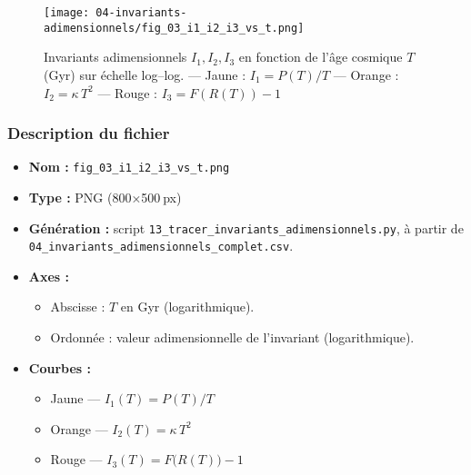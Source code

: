 \begin{figure}[htbp]
  \centering
  \texttt{[image: 04-invariants-adimensionnels/fig\_03\_i1\_i2\_i3\_vs\_t.png]}
  \caption{Invariants adimensionnels \(I_{1},I_{2},I_{3}\) en fonction de l’âge cosmique \(T\) (Gyr) sur échelle log–log.  
    — Jaune : \(I_{1}=P(T)/T\)  
    — Orange : \(I_{2}=\kappa\,T^{2}\)  
    — Rouge : \(I_{3}=F(R(T))-1\)}
  \label{fig:invariants_vs_t}
\end{figure}

\subsubsection*{Description du fichier}
\begin{itemize}
  \item \textbf{Nom :} \texttt{fig\_03\_i1\_i2\_i3\_vs\_t.png}  
  \item \textbf{Type :} PNG (800×500 px)  
  \item \textbf{Génération :} script \texttt{13\_tracer\_invariants\_adimensionnels.py}, à partir de \texttt{04\_invariants\_adimensionnels\_complet.csv}.  
  \item \textbf{Axes :}  
    \begin{itemize}
      \item Abscisse : \(T\) en Gyr (logarithmique).  
      \item Ordonnée : valeur adimensionnelle de l’invariant (logarithmique).  
    \end{itemize}
  \item \textbf{Courbes :}  
    \begin{itemize}
      \item Jaune — \(I_{1}(T)=P(T)/T\)  
      \item Orange — \(I_{2}(T)=\kappa\,T^{2}\)  
      \item Rouge — \(I_{3}(T)=F\bigl(R(T)\bigr)-1\)  
    \end{itemize}
\end{itemize}

